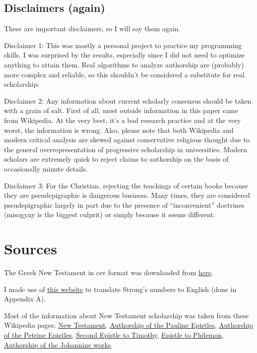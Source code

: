 \documentclass[12pt,letterpaper]{article}
\begin{document}
\subsection{Disclaimers (again)}
These are important disclaimers, so I will say them again.

Disclaimer 1: This was mostly a personal project to practice my programming skills.  I was surprised by the results, especially since I did not need to optimize anything to attain them.  Real algorithms to analyze authorship are (probably) more complex and reliable, so this shouldn't be considered a substitute for real scholarship.  

Disclaimer 2: Any information about current scholarly consensus should be taken with a grain of salt.  First of all, most outside information in this paper came from Wikipedia.  At the very best, it's a bad research practice and at the very worst, the information is wrong.  Also, please note that both Wikipedia and modern critical analysis are skewed against conservative religious thought due to the general overrepresentation of progressive scholarship in universities.  Modern scholars are extremely quick to reject claims to authorship on the basis of occasionally minute details.  

Disclaimer 3: For the Christian, rejecting the teachings of certain books because they are pseudepigraphic is dangerous business.  Many times, they are considered pseudepigraphic largely in part due to the presence of ``inconvenient'' doctrines (misogyny is the biggest culprit) or simply because it seems different.  


\section{Sources}
The Greek New Testament in csv format was downloaded from \underline{\href{https://github.com/biblicalhumanities/Nestle1904/tree/master/morph}{here}}.  

I made use of \underline{\href{http://kingjamesbibledictionary.com/}{this website}} to translate Strong's numbers to English (done in Appendix A).

Most of the information about New Testament scholarship was taken from these Wikipedia pages: \underline{\href{https://en.wikipedia.org/wiki/New_Testament}{New Testament}}, \underline{\href{https://en.wikipedia.org/wiki/Authorship_of_the_Pauline_epistles}{Authorship of the Pauline Epistles}}, \underline{\href{https://en.wikipedia.org/wiki/Authorship_of_the_Petrine_epistles}{Authorship of the Petrine Epistles}}, \underline{\href{https://en.wikipedia.org/wiki/Second_Epistle_to_Timothy}{Second Epistle to Timothy}}, \underline{\href{https://en.wikipedia.org/wiki/Epistle_to_Philemon}{Epistle to Philemon}}, \underline{\href{https://en.wikipedia.org/wiki/Authorship_of_the_Johannine_works}{Authorship of the Johannine works}}. 
\end{document}
